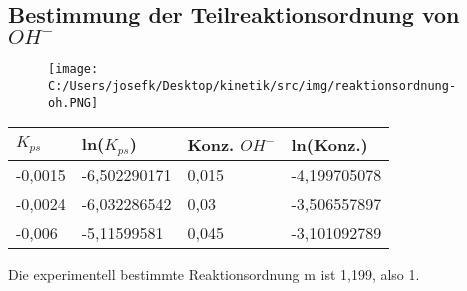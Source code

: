 \subsection{Bestimmung der Teilreaktionsordnung von $OH^-$}

\begin{figure}[H]
	\texttt{[image: C:/Users/josefk/Desktop/kinetik/src/img/reaktionsordnung-oh.PNG]}
\end{figure}

\begin{table}[H]
	\centering
	\begin{tabular}{llll}
		\toprule
		$K_{ps}$ & ln($K_{ps}$) & Konz. $OH^-$ & ln(Konz.)    \\
		\midrule
		-0,0015  & -6,502290171 & 0,015        & -4,199705078 \\
		-0,0024  & -6,032286542 & 0,03         & -3,506557897 \\
		-0,006   & -5,11599581  & 0,045        & -3,101092789 \\
		\bottomrule
	\end{tabular}
\end{table}

Die experimentell bestimmte Reaktionsordnung m ist 1,199, also 1.